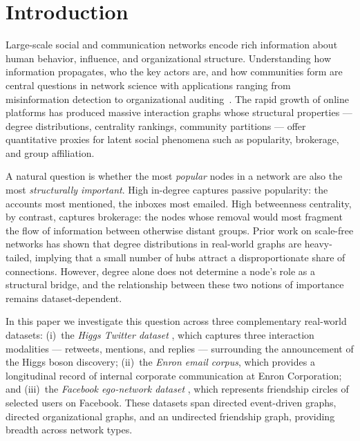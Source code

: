 \section{Introduction}

Large-scale social and communication networks encode rich information about
human behavior, influence, and organizational structure.
Understanding how information propagates, who the key actors are, and how
communities form are central questions in network science with applications
ranging from misinformation detection to organizational
auditing~\citep{newman2018networks}.
The rapid growth of online platforms has produced massive interaction graphs
whose structural properties — degree distributions, centrality rankings,
community partitions — offer quantitative proxies for latent social phenomena
such as popularity, brokerage, and group affiliation.

A natural question is whether the most \textit{popular} nodes in a network
are also the most \textit{structurally important}.
High in-degree captures passive popularity: the accounts most mentioned, the
inboxes most emailed.
High betweenness centrality, by contrast, captures brokerage: the nodes
whose removal would most fragment the flow of information between otherwise
distant groups.
Prior work on scale-free networks \citep{barabasi1999} has shown that
degree distributions in real-world graphs are heavy-tailed, implying that
a small number of hubs attract a disproportionate share of connections.
However, degree alone does not determine a node's role as a structural
bridge, and the relationship between these two notions of importance
remains dataset-dependent.

In this paper we investigate this question across three complementary
real-world datasets:
(i)~the \textit{Higgs Twitter dataset} \citep{higgs2013}, which captures
three interaction modalities — retweets, mentions, and replies — surrounding
the announcement of the Higgs boson discovery;
(ii)~the \textit{Enron email corpus}, which provides a longitudinal record
of internal corporate communication at Enron Corporation; and
(iii)~the \textit{Facebook ego-network dataset} \citep{leskovec2012}, which
represents friendship circles of selected users on Facebook.
These datasets span directed event-driven graphs, directed organizational
graphs, and an undirected friendship graph, providing breadth across
network types.

